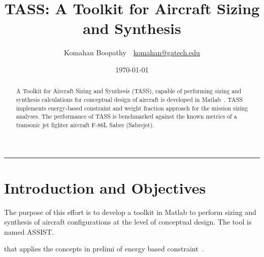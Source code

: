\documentclass[pdftex,11pt,letter]{article}
\title{\textbf{TASS: A Toolkit for Aircraft Sizing and Synthesis}}
\author{Komahan Boopathy~~\url{komahan@gatech.edu}} \date{\today}
\begin{document}
\maketitle
\vspace{-0.25in}
\rule{\linewidth}{2pt}

\begin{abstract}
A Toolkit for Aircraft Sizing and Synthesis (TASS), capable of performing sizing and synthesis calculations for conceptual design of aircraft is developed in Matlab~\cite{MATLAB}. TASS implements energy-based constraint and weight fraction approach for the mission sizing analyses.  The performance of TASS is benchmarked against the known metrics of a transonic jet fighter aircraft F-86L Sabre (Sabrejet).
\end{abstract}

\section{Introduction and Objectives}


The purpose of this effort is to develop a toolkit in Matlab to perform sizing and synthesis of aircraft configurations at the level of conceptual design. The tool is named ASSIST. 

 that applies the concepts in prelimi of energy based constraint~\cite{RaymerText}.


	
\end{document}
